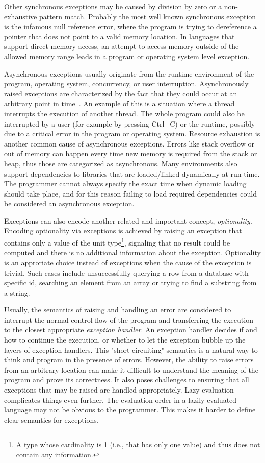 Other synchronous exceptions may be caused by division by zero or a non-exhaustive pattern match. Probably the most well known synchronous exception is the infamous null reference error, where the program is trying to dereference a pointer that does not point to a valid memory location. In languages that support direct memory access, an attempt to access memory outside of the allowed memory range leads in a program or operating system level exception.~\cite{akward-squad}

Asynchronous exceptions usually originate from the runtime environment of the program, operating system, concurrency, or user interruption. Asynchronously raised exceptions are characterized by the fact that they could occur at an arbitrary point in time~\cite{async-exc}. An example of this is a situation where a thread interrupts the execution of another thread. The whole program could also be interrupted by a user (for example by pressing Ctrl+C) or the runtime, possibly due to a critical error in the program or operating system. Resource exhaustion is another common cause of asynchronous exceptions. Errors like stack overflow or out of memory can happen every time new memory is required from the stack or heap, thus those are categorized as asynchronous. Many environments also support dependencies to libraries that are loaded/linked  dynamically at run time. The programmer cannot always specify the exact time when dynamic loading should take place, and for this reason failing to load required dependencies could be considered an asynchronous exception.~\cite{akward-squad}

Exceptions can also encode another related and important concept, \textit{optionality}. Encoding optionality via exceptions is achieved by raising an exception that contains only a value of the unit type\footnote{A type whose cardinality is 1 (i.e., that has only one value) and thus does not contain any information.}, signaling that no result could be computed and there is no additional information about the exception. Optionality is an approriate choice instead of exceptions when the cause of the exception is trivial. Such cases include unsuccessfully querying a row from a database with specific id, searching an element from an array or trying to find a substring from a string.

Usually, the semantics of raising and handling an error are considered to interrupt the normal control flow of the program and transferring the execution to the closest appropriate \textit{exception handler}. An exception handler decides if and how to continue the execution, or whether to let the exception bubble up the layers of exception handlers. This "short-circuiting" semantics is a natural way to think and program in the presence of errors. However, the ability to raise errors from an arbitrary location can make it difficult to understand the meaning of the program and prove its correctness. It also poses challenges to ensuring that all exceptions that may be raised are handled appropriately. Lazy evaluation complicates things even further. The evaluation order in a lazily evaluated language may not be obvious to the programmer. This makes it harder to define clear semantics for exceptions.~\cite{imprecise-exceptions}

